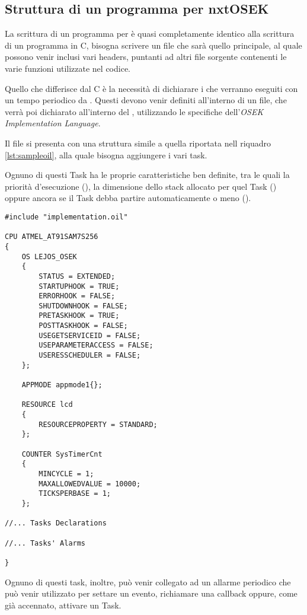 \subsection{Struttura di un programma per nxtOSEK}
La scrittura di un programma per \nxtOSEK{} è quasi completamente identico
alla scrittura di un programma in C, bisogna scrivere un file che sarà
quello principale, al quale possono venir inclusi vari headers, puntanti ad
altri file sorgente contenenti le varie funzioni utilizzate nel codice.

Quello che differisce dal C è la necessità di dichiarare i 
che verranno eseguiti con un tempo periodico da \nxtOSEK{}. Questi devono
venir definiti all'interno di un file, che verrà poi dichiarato all'interno
del , utilizzando le specifiche dell'\emph{OSEK
Implementation Language}\cite{bib:OIL}.

Il file si presenta con una struttura simile a quella riportata nell
riquadro \ref{lst:sampleoil}, alla quale bisogna aggiungere i vari task.

Ognuno di questi Task ha le proprie caratteristiche ben definite, tra le
quali la priorità d'esecuzione (), la dimensione dello
stack allocato per quel Task () oppure ancora se il Task
debba partire automaticamente o meno ().

\begin{figure*}[htbp]
    \begin{lstlisting}[caption=Sample \emph{OIL} file,
                       label=lst:sampleoil]
#include "implementation.oil"

CPU ATMEL_AT91SAM7S256
{
    OS LEJOS_OSEK
    {
        STATUS = EXTENDED;
        STARTUPHOOK = TRUE;
        ERRORHOOK = FALSE;
        SHUTDOWNHOOK = FALSE;
        PRETASKHOOK = TRUE;
        POSTTASKHOOK = FALSE;
        USEGETSERVICEID = FALSE;
        USEPARAMETERACCESS = FALSE;
        USERESSCHEDULER = FALSE;
    };

    APPMODE appmode1{}; 

    RESOURCE lcd
    {
        RESOURCEPROPERTY = STANDARD;
    };

  	COUNTER SysTimerCnt
  	{
    	MINCYCLE = 1;
    	MAXALLOWEDVALUE = 10000;
    	TICKSPERBASE = 1;
  	};

//... Tasks Declarations

//... Tasks' Alarms

}
    \end{lstlisting}
\end{figure*}
Ognuno di questi task, inoltre, può venir collegato ad un allarme periodico
che può venir utilizzato per settare un evento, richiamare una callback
oppure, come già accennato, attivare un Task.

